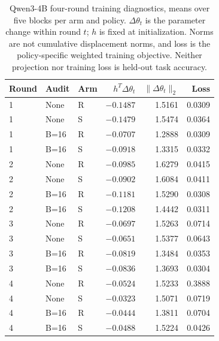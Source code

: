 \begin{table}[H]
\caption{Qwen3-4B four-round training diagnostics, means over five blocks per arm and policy. $\Delta\theta_t$ is the parameter change within round $t$; $h$ is fixed at initialization. Norms are not cumulative displacement norms, and loss is the policy-specific weighted training objective. Neither projection nor training loss is held-out task accuracy.}
\label{tab:qwen4b-training}
\centering\small\setlength{\tabcolsep}{4pt}
\begin{tabular}{@{}lllrrr@{}}
\toprule
Round & Audit & Arm & $h^T\Delta\theta_t$ & $\|\Delta\theta_t\|_2$ & Loss\\
\midrule
1 & None & R & $-0.1487$ & 1.5161 & 0.0309\\
1 & None & S & $-0.1479$ & 1.5474 & 0.0364\\
1 & B=16 & R & $-0.0707$ & 1.2888 & 0.0309\\
1 & B=16 & S & $-0.0918$ & 1.3315 & 0.0332\\
2 & None & R & $-0.0985$ & 1.6279 & 0.0415\\
2 & None & S & $-0.0902$ & 1.6084 & 0.0411\\
2 & B=16 & R & $-0.1181$ & 1.5290 & 0.0308\\
2 & B=16 & S & $-0.1208$ & 1.4442 & 0.0311\\
3 & None & R & $-0.0697$ & 1.5263 & 0.0714\\
3 & None & S & $-0.0651$ & 1.5377 & 0.0643\\
3 & B=16 & R & $-0.0819$ & 1.3484 & 0.0353\\
3 & B=16 & S & $-0.0836$ & 1.3693 & 0.0304\\
4 & None & R & $-0.0524$ & 1.5233 & 0.3888\\
4 & None & S & $-0.0323$ & 1.5071 & 0.0719\\
4 & B=16 & R & $-0.0444$ & 1.3811 & 0.0704\\
4 & B=16 & S & $-0.0488$ & 1.5224 & 0.0426\\
\bottomrule
\end{tabular}
\end{table}
